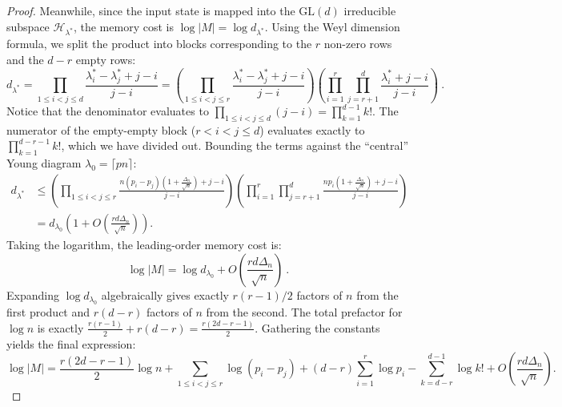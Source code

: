 \documentclass[11pt,letterpaper]{article}
\begin{document}
\begin{proof}
Meanwhile, since the input state is mapped into the $\mathrm{GL}(d)$ irreducible subspace $\mathcal{H}_{\lambda^*}$, the memory cost is $\log|M| = \log d_{\lambda^*}$. Using the Weyl dimension formula, we split the product into blocks corresponding to the $r$ non-zero rows and the $d-r$ empty rows:
\begin{equation}
    d_{\lambda^*} = \prod_{1 \le i < j \le d} \frac{\lambda^*_i - \lambda^*_j + j - i}{j - i} = \left( \prod_{1 \le i < j \le r} \frac{\lambda^*_i - \lambda^*_j + j - i}{j - i} \right) \left( \prod_{i=1}^r \prod_{j=r+1}^d \frac{\lambda^*_i + j - i}{j - i} \right) \ .
\end{equation}
Notice that the denominator evaluates to $\prod_{1 \le i < j \le d} (j-i) = \prod_{k=1}^{d-1} k!$. The numerator of the empty-empty block ($r < i < j \le d$) evaluates exactly to $\prod_{k=1}^{d-r-1} k!$, which we have divided out. 
Bounding the terms against the ``central'' Young diagram $\lambda_0 = \lceil pn \rceil$:
\begin{equation}
    \begin{aligned}
        d_{\lambda^*} &\le \left( \prod_{1 \le i < j \le r} \frac{n(p_i - p_j)(1+\frac{\Delta_n}{\sqrt{n}}) + j - i}{j - i} \right) \left( \prod_{i=1}^r \prod_{j=r+1}^d \frac{np_i(1+\frac{\Delta_n}{\sqrt{n}}) + j - i}{j - i} \right) \\
        &= d_{\lambda_0}\left(1+O\left(\frac{rd\Delta_n}{\sqrt{n}}\right)\right).
    \end{aligned}
\end{equation}
Taking the logarithm, the leading-order memory cost is:
\begin{equation}
    \log|M| = \log d_{\lambda_0} + O\left(\frac{r d \Delta_n}{\sqrt{n}}\right) \ .
\end{equation}
Expanding $\log d_{\lambda_0}$ algebraically gives exactly $r(r-1)/2$ factors of $n$ from the first product and $r(d-r)$ factors of $n$ from the second. The total prefactor for $\log n$ is exactly $\frac{r(r-1)}{2} + r(d-r) = \frac{r(2d-r-1)}{2}$. Gathering the constants yields the final expression:
\begin{equation}
    \log|M| = \frac{r(2d-r-1)}{2}\log n + \sum_{1 \le i < j \le r}\log(p_i-p_j) + (d-r)\sum_{i=1}^r \log p_i - \sum_{k=d-r}^{d-1}\log k! + O\left(\frac{rd\Delta_n}{\sqrt{n}}\right).
\end{equation}
\end{proof}
\end{document}
